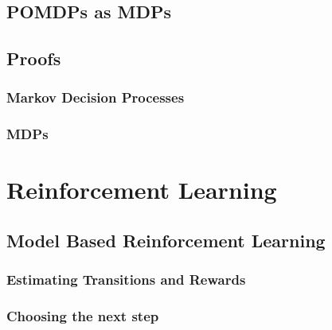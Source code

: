       \subsection{POMDPs as MDPs}\label{subsec:pomdps_as_mdps}
        

  \subsection{Proofs}\label{subsec:proofs}
      \subsubsection{Markov Decision Processes}
        
      \subsubsection{MDPs}
        


\newpage
  \section{Reinforcement Learning}\label{sec:reinforcement_learning}
      
      
      
      
      \subsection{Model Based Reinforcement Learning}\label{subsec:model_based_reinforcement_learning}
        
        \subsubsection{Estimating Transitions and Rewards}\label{subsubsec:estimating_transitions_and_rewards}
          
        \subsubsection{Choosing the next step}
          
